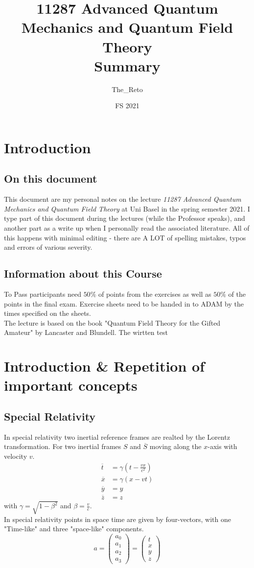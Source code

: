 \documentclass{report}
\title{11287 Advanced Quantum Mechanics and Quantum Field Theory\\
\large Summary}
\author{The\_Reto}
\date{FS 2021}
\begin{document}
\maketitle
    
\chapter*{Introduction}
\section*{On this document}
This document are my personal notes on the lecture \emph{11287 Advanced Quantum Mechanics and Quantum Field Theory} at Uni Basel in the spring semester 2021. 
I type part of this document during the lectures (while the Professor speaks), and another part as a write up when I personally read the associated literature. All of this happens with minimal editing - there are A LOT of spelling mistakes, typos and errors of various severity.
\section*{Information about this Course}
To Pass participants need $50\%$ of points from the exercises as well as  $50\%$ of the points in the final exam. Exercise sheets need to be handed in to ADAM by the times specified on the sheets.\\
The lecture is based on the book "Quantum Field Theory for the Gifted Amateur" by Lancaster and Blundell.
The wirtten test
\tableofcontents
\newpage
\chapter{Introduction \& Repetition of important concepts}
\section{Special Relativity}
In special relativity two inertial reference frames are realted by the Lorentz transformation. For two inertial frames $S$ and $\overline{S}$ moving along the $x$-axis with velocity $v$.
\begin{align*}
	\overline{t} &= \gamma \left( t - \frac{vx}{c^2} \right) \\ 
	\overline{x} &= \gamma \left( x - vt \right) \\
	\overline{y} &= y \\
	\overline{z} &= z
\end{align*}
with $\gamma = \sqrt{1- \beta^2}$ and $\beta = \frac{v}{c}$.\\
In special relativity points in space time are given by four-vectors, with one "Time-like" and three "space-like" components. \[
a = \begin{pmatrix} a_0\\ a_1 \\ a_2\\ a_3 \end{pmatrix} = \begin{pmatrix} t\\ x \\ y \\ z \end{pmatrix}
\] 
\end{document}
